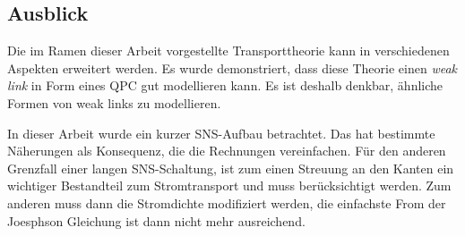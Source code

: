 \subsection*{Ausblick}

Die im Ramen dieser Arbeit vorgestellte Transporttheorie kann in verschiedenen Aspekten erweitert werden. Es wurde demonstriert, dass diese Theorie einen \emph{weak link} in Form eines QPC gut modellieren kann. Es ist deshalb denkbar, \"ahnliche Formen von weak links zu modellieren.

In dieser Arbeit wurde ein kurzer SNS-Aufbau betrachtet. Das hat bestimmte N\"aherungen als Konsequenz, die die Rechnungen vereinfachen. F\"ur den anderen Grenzfall einer langen SNS-Schaltung, ist zum einen Streuung an den Kanten ein wichtiger Bestandteil zum Stromtransport und muss ber\"ucksichtigt werden. Zum anderen muss dann die Stromdichte modifiziert werden, die einfachste From der Joesphson Gleichung ist dann nicht mehr ausreichend.






